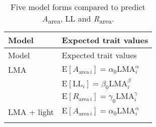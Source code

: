 \documentclass[
  12pt,
]{article}
\begin{document}
\begin{longtable}[]{@{}ll@{}}
\caption{\label{tab:modeltab} Five model forms compared to predict \emph{A}\textsubscript{area}, LL and \emph{R}\textsubscript{area}.}\tabularnewline
\toprule
\begin{minipage}[b]{0.14\columnwidth}\raggedright
Model\strut
\end{minipage} & \begin{minipage}[b]{0.80\columnwidth}\raggedright
Expected trait values\strut
\end{minipage}\tabularnewline
\midrule
\endfirsthead
\toprule
\begin{minipage}[b]{0.14\columnwidth}\raggedright
Model\strut
\end{minipage} & \begin{minipage}[b]{0.80\columnwidth}\raggedright
Expected trait values\strut
\end{minipage}\tabularnewline
\midrule
\endhead
\begin{minipage}[t]{0.14\columnwidth}\raggedright
LMA\strut
\end{minipage} & \begin{minipage}[t]{0.80\columnwidth}\raggedright
\(\mathrm{E}[A_{\mathrm{area} \, i}] = \alpha_0\mathrm{LMA}_{i}^{\alpha}\)\strut
\end{minipage}\tabularnewline
\begin{minipage}[t]{0.14\columnwidth}\raggedright
\strut
\end{minipage} & \begin{minipage}[t]{0.80\columnwidth}\raggedright
\(\mathrm{E}[\mathrm{LL}_i] = \beta_0\mathrm{LMA}_{i}^{\beta}\)\strut
\end{minipage}\tabularnewline
\begin{minipage}[t]{0.14\columnwidth}\raggedright
\strut
\end{minipage} & \begin{minipage}[t]{0.80\columnwidth}\raggedright
\(\mathrm{E}[R_{\mathrm{area} \, i}] = \gamma_0\mathrm{LMA}_{i}^{\gamma}\)\strut
\end{minipage}\tabularnewline
\begin{minipage}[t]{0.14\columnwidth}\raggedright
LMA + light\strut
\end{minipage} & \begin{minipage}[t]{0.80\columnwidth}\raggedright
\(\mathrm{E}[A_{\mathrm{area} \, i}] = \alpha_0\mathrm{LMA}_{i}^{\alpha}\)\strut
\end{minipage}\tabularnewline
\begin{minipage}[t]{0.14\columnwidth}\raggedright

\end{minipage}
\end{longtable}
\end{document}
